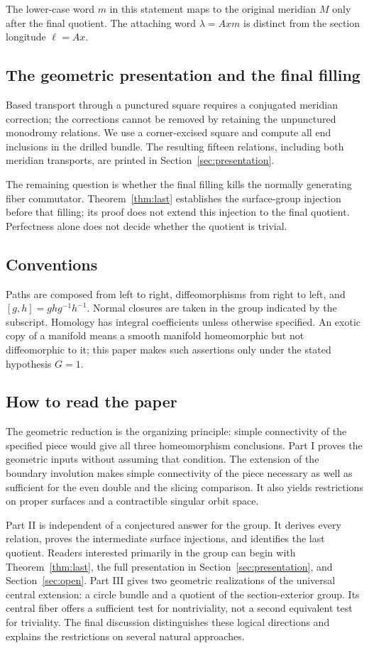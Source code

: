 \documentclass[11pt]{amsart}
\theoremstyle{definition}
\theoremstyle{remark}
\begin{document}
The lower-case word $m$ in this statement maps to the original meridian
$M$ only after the final quotient. The attaching word $\lambda=Axm$
is distinct from the section longitude $\ell=Ax$.

\subsection*{The geometric presentation and the final filling}
Based transport through a punctured square
requires a conjugated meridian correction; the corrections cannot be
removed by retaining the unpunctured monodromy relations. We use a
corner-excised square and compute all end inclusions in the drilled
bundle. The resulting fifteen relations,
including both meridian transports, are printed in
Section~\ref{sec:presentation}.

The remaining question is whether the final filling kills the normally
generating fiber commutator. Theorem~\ref{thm:last} establishes the
surface-group injection before that filling; its proof does not extend
this injection to the final quotient. Perfectness alone does not decide
whether the quotient is trivial.

\subsection*{Conventions}
Paths are composed from left to right, diffeomorphisms from right to
left, and $[g,h]=ghg^{-1}h^{-1}$. Normal closures are taken in the
group indicated by the subscript. Homology has integral coefficients
unless otherwise specified. An exotic copy of a manifold means a
smooth manifold homeomorphic but not diffeomorphic to it; this paper
makes such assertions only under the stated hypothesis $G=1$.

\subsection*{How to read the paper}
The geometric reduction is the organizing principle:
simple connectivity of the specified piece would give all three
homeomorphism conclusions. Part I proves the geometric inputs without
assuming that condition. The extension of the boundary involution makes
simple connectivity of the piece necessary as well as sufficient for
the even double and the slicing comparison. It also yields restrictions
on proper surfaces and a contractible singular orbit space.

Part II is independent of a conjectured answer for the group. It derives
every relation, proves the intermediate surface injections, and identifies
the last quotient. Readers interested primarily in the group can begin
with Theorem~\ref{thm:last}, the full presentation in
Section~\ref{sec:presentation}, and Section~\ref{sec:open}.
Part III gives two geometric realizations of the universal central
extension: a circle bundle and a quotient of the section-exterior group.
Its central fiber offers a sufficient test for nontriviality, not a
second equivalent test for triviality. The final discussion distinguishes
these logical directions and explains the restrictions on several
natural approaches.
\end{document}
